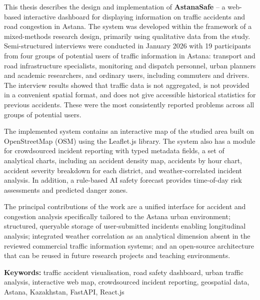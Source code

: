 ﻿\documentclass[12pt,a4paper]{report}
\begin{document}
This thesis describes the design and implementation of \textbf{AstanaSafe} -- a
web-based interactive dashboard for displaying information on traffic accidents and
road congestion in Astana. The system was developed within the framework of a
mixed-methods research design, primarily using qualitative data from the study.
Semi-structured interviews were conducted in January 2026 with 19 participants from
four groups of potential users of traffic information in Astana: transport and road
infrastructure specialists, monitoring and dispatch personnel, urban planners and
academic researchers, and ordinary users, including commuters and drivers.
The interview results showed that traffic data is not aggregated, is not provided in a
convenient spatial format, and does not give accessible historical statistics for
previous accidents. These were the most consistently reported problems across all
groups of potential users.

The implemented system contains an interactive map of the studied area built on
OpenStreetMap (OSM) using the Leaflet.js library. The system also has a module for
crowdsourced incident reporting with typed metadata fields, a set of analytical charts,
including an accident density map, accidents by hour chart, accident severity breakdown
for each district, and weather-correlated incident analysis. In addition, a rule-based
AI safety forecast provides time-of-day risk assessments and predicted danger zones.

The principal contributions of the work are a unified interface for accident and
congestion analysis specifically tailored to the Astana urban environment; structured,
queryable storage of user-submitted incidents enabling longitudinal analysis; integrated
weather correlation as an analytical dimension absent in the reviewed commercial traffic
information systems; and an open-source architecture that can be reused in future
research projects and teaching environments.

\vspace{0.5cm}
\noindent\textbf{Keywords:} traffic accident visualisation, road safety dashboard,
urban traffic analysis, interactive web map, crowdsourced incident reporting,
geospatial data, Astana, Kazakhstan, FastAPI, React.js


\clearpage
\listoftables
\clearpage

\listoffigures
\clearpage
\end{document}
